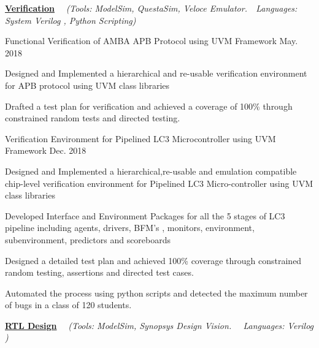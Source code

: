 \begin{flushleft}
  \par\addvspace{-1.5mm}
  \fontsize{10.4pt}{1em}\selectfont\underline{\textbf{\color{black}Verification}} \ \ \textit{(\color{text}Tools: ModelSim, QuestaSim, Veloce Emulator.\ \ Languages: System Verilog , Python Scripting)}
\end{flushleft}
\par\addvspace{-0.5ex}
\begin{cvprojects}
  \cvproject
    {Functional Verification of AMBA APB Protocol using UVM Framework} 
    {\color{darkgray}May. 2018}
    {
      \begin{cvprojectitems}
        \item {Designed and Implemented a hierarchical and re-usable verification environment for APB protocol using UVM class libraries}
        \item {Drafted a test plan for verification and achieved a coverage of 100\% through constrained random tests and directed testing. }
      \end{cvprojectitems}
    }
  \cvproject
    {Verification Environment for Pipelined LC3 Microcontroller using UVM Framework }
    {\color{darkgray}Dec. 2018}
    {
      \begin{cvprojectitems}
        \item {Designed and Implemented a hierarchical,re-usable and emulation compatible chip-level verification environment for Pipelined LC3 Micro-controller using UVM class libraries}
        \item {Developed Interface and Environment Packages for all the 5 stages of LC3 pipeline including agents, drivers, BFM's , monitors, environment, subenvironment, predictors and scoreboards}
        \item {Designed a detailed test plan and achieved 100\% coverage through constrained random testing, assertions and directed test cases.}
        \item {Automated the process using python scripts and detected the maximum number of bugs in a class of 120 students.}
      \end{cvprojectitems}
    }
    \par\addvspace{3ex}
    \begin{flushleft}
    \par\addvspace{-1.5mm}
    \fontsize{10.4pt}{1em}\selectfont\underline{\textbf{\color{black}RTL Design}} \ \ \textit{(\color{text}Tools: ModelSim, Synopsys Design Vision. \ \ Languages: Verilog )}

\end{flushleft}
\end{cvprojects}
